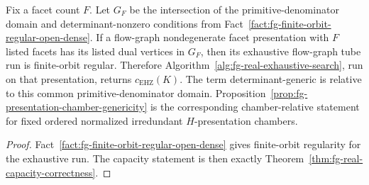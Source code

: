 \begin{unverified}
\begin{corollary}%
\label{cor:fg-real-capacity-correctness-generic}
Fix a facet count \(F\).  Let \(G_F\) be the intersection of the
primitive-denominator domain and determinant-nonzero conditions from
Fact~\ref{fact:fg-finite-orbit-regular-open-dense}.  If a flow-graph
nondegenerate facet presentation with \(F\) listed facets has its listed dual
vertices in \(G_F\), then its exhaustive flow-graph tube run is
finite-orbit regular.  Therefore
Algorithm~\ref{alg:fg-real-exhaustive-search}, run on that presentation,
returns \(c_{\mathrm{EHZ}}(K)\).
The term determinant-generic is relative to this common
primitive-denominator domain.  Proposition~\ref{prop:fg-presentation-chamber-genericity}
is the corresponding chamber-relative statement for fixed ordered normalized
irredundant \(H\)-presentation chambers.
\end{corollary}

\begin{proof}
Fact~\ref{fact:fg-finite-orbit-regular-open-dense} gives finite-orbit
regularity for the exhaustive run.  The capacity statement is then exactly
Theorem~\ref{thm:fg-real-capacity-correctness}.
\end{proof}
\end{unverified}

